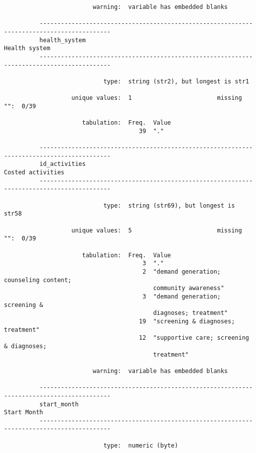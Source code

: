 \documentclass{article}
\begin{document}
\begin{verbatim}
                         warning:  variable has embedded blanks
          
          ------------------------------------------------------------------------------------------
          health_system                                                                Health system
          ------------------------------------------------------------------------------------------
          
                            type:  string (str2), but longest is str1
          
                   unique values:  1                        missing "":  0/39
          
                      tabulation:  Freq.  Value
                                      39  "."
          
          ------------------------------------------------------------------------------------------
          id_activities                                                            Costed activities
          ------------------------------------------------------------------------------------------
          
                            type:  string (str69), but longest is str58
          
                   unique values:  5                        missing "":  0/39
          
                      tabulation:  Freq.  Value
                                       3  "."
                                       2  "demand generation; counseling content;
                                          community awareness"
                                       3  "demand generation; screening &
                                          diagnoses; treatment"
                                      19  "screening & diagnoses; treatment"
                                      12  "supportive care; screening & diagnoses;
                                          treatment"
          
                         warning:  variable has embedded blanks
          
          ------------------------------------------------------------------------------------------
          start_month                                                                    Start Month
          ------------------------------------------------------------------------------------------
          
                            type:  numeric (byte)
          

\end{verbatim}
\end{document}
